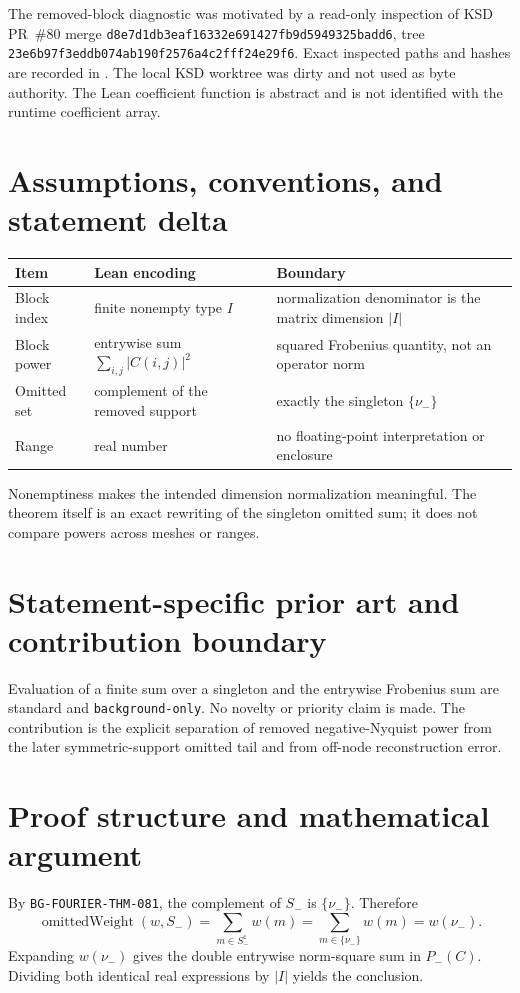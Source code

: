 \documentclass[11pt]{article}
\begin{document}
The removed-block diagnostic was motivated by a read-only inspection of KSD PR~\#80 merge
\texttt{d8e7d1db3eaf16332e691427fb9d5949325badd6}, tree
\texttt{23e6b97f3eddb074ab190f2576a4c2fff24e29f6}.  Exact inspected paths and hashes are recorded in
.  The local KSD worktree was dirty and not used as byte authority.  The
Lean coefficient function is abstract and is not identified with the runtime coefficient array.

\section{Assumptions, conventions, and statement delta}
\begin{tabularx}{\textwidth}{@{}lXX@{}}
\toprule
Item & Lean encoding & Boundary \\
\midrule
Block index & finite nonempty type $I$ & normalization denominator is the matrix dimension $|I|$ \\
Block power & entrywise sum $\sum_{i,j}|C(i,j)|^2$ & squared Frobenius quantity, not an operator norm \\
Omitted set & complement of the removed support & exactly the singleton $\{\nu_-\}$ \\
Range & real number & no floating-point interpretation or enclosure \\
\bottomrule
\end{tabularx}
Nonemptiness makes the intended dimension normalization meaningful.  The theorem itself is an exact
rewriting of the singleton omitted sum; it does not compare powers across meshes or ranges.

\section{Statement-specific prior art and contribution boundary}
Evaluation of a finite sum over a singleton and the entrywise Frobenius sum are standard and
\texttt{background-only}.  No novelty or priority claim is made.  The contribution is the explicit
separation of removed negative-Nyquist power from the later symmetric-support omitted tail and from
off-node reconstruction error.

\section{Proof structure and mathematical argument}
By \texttt{BG-FOURIER-THM-081}, the complement of $S_-$ is $\{\nu_-\}$.  Therefore
\[
 \operatorname{omittedWeight}(w,S_-)
   =\sum_{m\in S_-^{\mathsf c}}w(m)
   =\sum_{m\in\{\nu_-\}}w(m)
   =w(\nu_-).
\]
Expanding $w(\nu_-)$ gives the double entrywise norm-square sum in $P_-(C)$.  Dividing both
identical real expressions by $|I|$ yields the conclusion.
\end{document}

